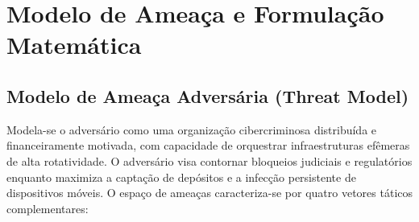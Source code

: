 \section{Modelo de Amea\c{c}a e Formula\c{c}\~{a}o Matem\'{a}tica}
\label{sec:modelo_ameaca}

\subsection{Modelo de Amea\c{c}a Advers\'{a}ria (Threat Model)}

Modela-se o advers\'{a}rio como uma organiza\c{c}\~{a}o cibercriminosa distribu\'{i}da e financeiramente motivada, com capacidade de orquestrar infraestruturas ef\^{e}meras de alta rotatividade. O advers\'{a}rio visa contornar bloqueios judiciais e regulat\'{o}rios enquanto maximiza a capta\c{c}\~{a}o de dep\'{o}sitos e a infec\c{c}\~{a}o persistente de dispositivos m\'{o}veis. O espa\c{c}o de amea\c{c}as caracteriza-se por quatro vetores t\'{a}ticos complementares:

